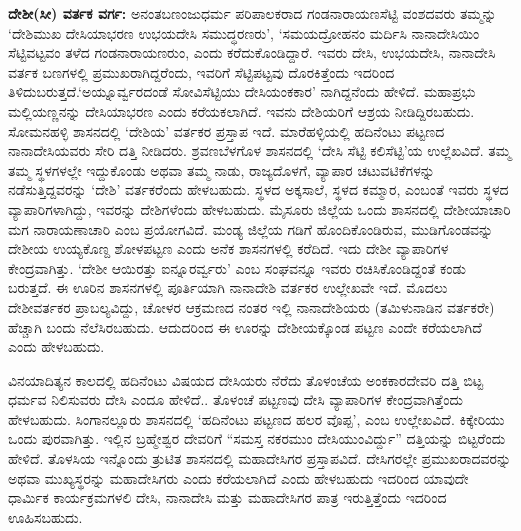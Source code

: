 \textbf{ದೇಶೀ(ಸೀ) ವರ್ತಕ ವರ್ಗ:} ಅನಂತಬಣಂಜುಧರ್ಮ ಪರಿಪಾಲಕರಾದ ಗಂಡನಾರಾಯಣಸೆಟ್ಟಿ ವಂಶದವರು ತಮ್ಮನ್ನು ‘ದೇಶಿಮುಖ ದೇಸಿಯಾಭರಣ ಉಭಯದೇಸಿ ಸಮುದ್ಧರಣರು’, ‘ಸಮಯದ್ರೋಹನಂ ಮರ್ದಿಸಿ ನಾನಾದೇಸಿಯಿಂ ಸೆಟ್ಟಿವಟ್ಟವಂ ತಳೆದ ಗಂಡನಾರಾಯಣರುಂ, ಎಂದು ಕರೆದುಕೊಂಡಿದ್ದಾರೆ. ಇವರು ದೇಸಿ, ಉಭಯದೇಸಿ, ನಾನಾದೇಸಿ ವರ್ತಕ ಬಣಗಳಲ್ಲಿ ಪ್ರಮುಖರಾಗಿದ್ದರೆಂದು, ಇವರಿಗೆ ಸೆಟ್ಟಿಪಟ್ಟವು ದೊರಕಿತ್ತೆಂದು ಇದರಿಂದ ತಿಳಿದುಬರುತ್ತದೆ.\break ‘ಅಯ್ನೂರ್ವ್ವರದಂಡೆ ಸೋವಿಸೆಟ್ಟಿಯು ದೇಸಿಯಂಕಕಾರ’ ನಾಗಿದ್ದನೆಂದು ಹೇಳಿದೆ. ಮಹಾಪ್ರಭು ಮಲ್ಲಿಯಣ್ಣನನ್ನು ದೇಸಿಯಾಭರಣ ಎಂದು ಕರೆಯಕಲಾಗಿದೆ. ಇವನು ದೇಶಿಯರಿಗೆ ಆಶ್ರಯ ನೀಡಿದ್ದಿರಬಹುದು. ಸೋಮನಹಳ್ಳಿ ಶಾಸನದಲ್ಲಿ ‘ದೇಶಿಯ’ ವರ್ತಕರ ಪ್ರಸ್ತಾಪ ಇದೆ. ಮಾರೆಹಳ್ಳಿಯಲ್ಲಿ ಹದಿನೆಂಟು ಪಟ್ಟಣದ ನಾನಾದೇಸಿಯವರು ಸೇರಿ ದತ್ತಿ ನೀಡಿದರು. ಶ್ರವಣಬೆಳಗೊಳ ಶಾಸನದಲ್ಲಿ ‘ದೇಸಿ ಸೆಟ್ಟಿ ಕಲಿಸೆಟ್ಟಿ’ಯ ಉಲ್ಲೆಖವಿದೆ. ತಮ್ಮ ತಮ್ಮ ಸ್ಥಳಗಳಲ್ಲೇ ಇದ್ದುಕೊಂಡು ಅಥವಾ ತಮ್ಮ ನಾಡು, ರಾಜ್ಯದೊಳಗೆ, ವ್ಯಾಪಾರ ಚಟುವಟಿಕೆಗಳನ್ನು ನಡೆಸುತ್ತಿದ್ದವರನ್ನು ‘ದೇಶಿ’ ವರ್ತಕರೆಂದು ಹೇಳಬಹುದು. ಸ್ಥಳದ ಅಕ್ಕಸಾಲೆ, ಸ್ಥಳದ ಕಮ್ಮಾರ, ಎಂಬಂತೆ ಇವರು ಸ್ಥಳದ ವ್ಯಾಪಾರಿಗಳಾಗಿದ್ದು, ಇವರನ್ನು ದೇಶಿಗಳೆಂದು ಹೇಳಬಹುದು. ಮೈಸೂರು ಜಿಲ್ಲೆಯ ಒಂದು ಶಾಸನದಲ್ಲಿ ದೇಶೀಯಾಚಾರಿ ಮಗ ನಾರಾಯಣಾಚಾರಿ ಎಂಬ ಪ್ರಯೋಗವಿದೆ. ಮಂಡ್ಯ ಜಿಲ್ಲೆಯ ಗಡಿಗೆ ಹೊಂದಿಕೊಂಡಿರುವ, ಮುಡಿಗೊಂಡವನ್ನು ದೇಶೀಯ ಉಯ್ಯಕೊಣ್ದ ಶೋಳಪಟ್ಟಣ ಎಂದು ಅನೆಕ ಶಾಸನಗಳಲ್ಲಿ ಕರೆದಿದೆ. ಇದು ದೇಶೀ ವ್ಯಾಪಾರಿಗಳ ಕೇಂದ್ರವಾಗಿತ್ತು. ‘ದೇಶೀ ಆಯಿರತ್ತು ಐನ್ನೂರರ್ವ್ವರು’ ಎಂಬ ಸಂಘವನ್ನೂ ಇವರು ರಚಿಸಿಕೊಂಡಿದ್ದಂತೆ ಕಂಡು ಬರುತ್ತದೆ. ಈ ಊರಿನ ಶಾಸನಗಳಲ್ಲಿ ಪೂರ್ತಿಯಾಗಿ ನಾನಾದೇಶಿ ವರ್ತಕರ ಉಲ್ಲೇಖವೇ ಇದೆ. ಮೊದಲು ದೇಶೀವರ್ತಕರ ಪ್ರಾಬಲ್ಯವಿದ್ದು, ಚೋಳರ ಆಕ್ರಮಣದ ನಂತರ ಇಲ್ಲಿ ನಾನಾದೇಶಿಯರು (ತಮಿಳುನಾಡಿನ ವರ್ತಕರೇ) ಹೆಚ್ಚಾಗಿ ಬಂದು ನೆಲೆಸಿರಬಹುದು. ಆದುದರಿಂದ ಈ ಊರನ್ನು ದೇಶೀಯಕ್ಕೊಂಡ ಪಟ್ಟಣ ಎಂದೇ ಕರೆಯಲಾಗಿದೆ ಎಂದು ಹೇಳಬಹುದು. 

ವಿನಯಾದಿತ್ಯನ ಕಾಲದಲ್ಲಿ ಹದಿನೆಂಟು ವಿಷಯದ ದೇಸಿಯರು ನೆರೆದು ತೊಳಂಚೆಯ ಅಂಕಕಾರದೇವರಿ ದತ್ತಿ ಬಿಟ್ಟ ಧರ್ಮವ ನಿಲಿಸುವರು ದೇಸಿ ಎಂದೂ ಹೇಳಿದೆ.. ತೊಳಂಚೆ ಪಟ್ಟಣವು ದೇಸಿ ವ್ಯಾಪಾರಿಗಳ ಕೇಂದ್ರವಾಗಿತ್ತೆಂದು ಹೇಳಬಹುದು. ಸಿಂಗಾನಲ್ಲೂರು ಶಾಸನದಲ್ಲಿ ‘ಹದಿನೆಂಟು ಪಟ್ಟಣದ ಹಲರ ವೊಪ್ಪ’, ಎಂಬ ಉಲ್ಲೇಖವಿದೆ. ಕಿಕ್ಕೇರಿಯು ಒಂದು ಪುರವಾಗಿತ್ತು. ಇಲ್ಲಿನ ಬ್ರಹ್ಮೇಶ್ವರ ದೇವರಿಗೆ “ಸಮಸ್ತ ನಕರಮುಂ ದೇಸಿಯುಂವಿರ್ದ್ದು” ದತ್ತಿಯನ್ನು ಬಿಟ್ಟರೆಂದು ಹೇಳಿದೆ. ತೊಳಸಿಯ ಇನ್ನೊಂದು ತ್ರುಟಿತ ಶಾಸನದಲ್ಲಿ ಮಹಾದೇಸಿಗರ ಪ್ರಸ್ತಾಪವಿದೆ. ದೇಸಿಗರಲ್ಲೇ ಪ್ರಮುಖರಾದವರನ್ನು ಅಥವಾ ಮುಖ್ಯಸ್ಥರನ್ನು ಮಹಾದೇಸಿಗರು ಎಂದು ಕರೆಯಲಾಗಿದೆ ಎಂದು ಹೇಳಬಹುದು ಇದರಿಂದ ಯಾವುದೇ ಧಾರ್ಮಿಕ ಕಾರ್ಯಕ್ರಮಗಳಲಿ ದೇಸಿ, ನಾನಾದೇಸಿ ಮತ್ತು ಮಹಾದೇಸಿಗರ ಪಾತ್ರ ಇರುತ್ತಿತ್ತೆಂದು ಇದರಿಂದ ಊಹಿಸಬಹುದು.

